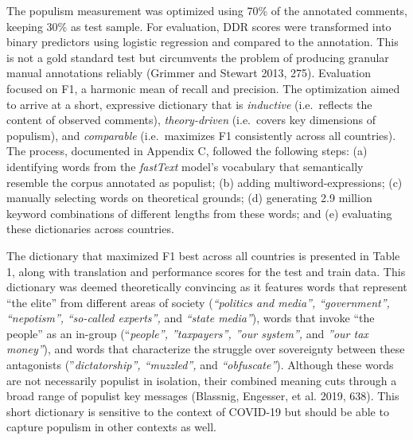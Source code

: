 \documentclass[
]{ccr}
\begin{document}
The populism measurement was optimized using 70\% of the annotated
comments, keeping 30\% as test sample. For evaluation, DDR scores were
transformed into binary predictors using logistic regression and
compared to the annotation. This is not a gold standard test but
circumvents the problem of producing granular manual annotations
reliably (Grimmer and Stewart 2013, 275). Evaluation focused on F1, a
harmonic mean of recall and precision. The optimization aimed to arrive
at a short, expressive dictionary that is \emph{inductive}
(i.e.~reflects the content of observed comments), \emph{theory-driven}
(i.e.~covers key dimensions of populism), and \emph{comparable}
(i.e.~maximizes F1 consistently across all countries). The process,
documented in Appendix C, followed the following steps: (a) identifying
words from the \emph{fastText} model's vocabulary that semantically
resemble the corpus annotated as populist; (b) adding
multiword-expressions; (c) manually selecting words on theoretical
grounds; (d) generating 2.9 million keyword combinations of different
lengths from these words; and (e) evaluating these dictionaries across
countries.

The dictionary that maximized F1 best across all countries is presented
in Table 1, along with translation and performance scores for the test
and train data. This dictionary was deemed theoretically convincing as
it features words that represent ``the elite'' from different areas of
society (\emph{``politics and media'', ``government'', ``nepotism'',}
\emph{``so-called experts'',} and \emph{``state media''}), words that
invoke ``the people'' as an in-group (``\emph{people'', ''taxpayers'',
''our system'',} and \emph{''our tax money''}), and words that
characterize the struggle over sovereignty between these antagonists
(''\emph{dictatorship'', ``muzzled'',} and \emph{``obfuscate''}).
Although these words are not necessarily populist in isolation, their
combined meaning cuts through a broad range of populist key messages
(Blassnig, Engesser, et al. 2019, 638). This short dictionary is
sensitive to the context of COVID-19 but should be able to capture
populism in other contexts as well.
\end{document}

